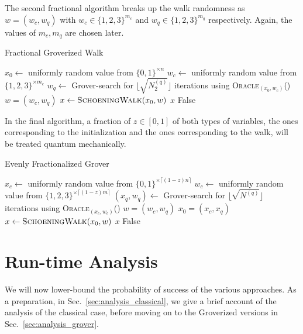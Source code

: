 \documentclass[a4paper,aps,floatfix]{revtex4}
\begin{document}
The second fractional algorithm breaks up the walk randomness as $w=(w_c, w_q)$ with $w_c\in\{1,2,3\}^{m_c}$ and $w_q\in\{1,2,3\}^{m_q}$ respectively.
Again, the values of $m_c, m_q$ are chosen later.

\begin{algorithm}[H]
	\caption{Fractional Groverized Walk}\label{alg:fgw}
	\begin{algorithmic}[1]
				\State $x_0\leftarrow$ uniformly random value from $\{0,1\}^{\times n}$
					\State $w_c\leftarrow$ uniformly random value from $\{1, 2, 3\}^{\times m_c}$
					\State $w_q\leftarrow$ Grover-search for $\Big\lfloor \sqrt{N_2^{(q)}}\Big\rfloor$ iterations using \textsc{Oracle$_{(x_0,w_c)}$}()
					\State $w=(w_c,w_q)$
					\State $x\leftarrow \textsc{SchoeningWalk}(x_0,w)$ 
						\State\Return $x$
					\EndIf
				\EndFor
			\EndFor
			\State \Return False
	\end{algorithmic}
\end{algorithm}

In the final algorithm, a fraction of $z\in[0,1]$ of both types of variables, the ones corresponding to the initialization and the ones corresponding to the walk, will be treated  quantum mechanically.

\begin{algorithm}[H]
	\caption{Evenly Fractionalized Grover}\label{alg:efg}
	\begin{algorithmic}[1]
		\State $x_c\leftarrow$ uniformly random value from $\{0,1\}^{\times \lceil (1-z) n\rceil}$
		\State $w_c\leftarrow$ uniformly random value from $\{1, 2, 3\}^{\times \lceil(1-z)m\rceil}$
			\State $(x_q,w_q)\leftarrow$ Grover-search for $\big\lfloor \sqrt{N^{(q)}}\big\rfloor$ iterations using \textsc{Oracle$_{(x_c,w_c)}$}()
			\State $w=(w_c,w_q)$
			\State $x_0=(x_c,x_q)$
			\State $x\leftarrow \textsc{SchoeningWalk}(x_0,w)$ 
				\State\Return $x$
			\EndIf
		\EndFor
		\State \Return False
	\end{algorithmic}
\end{algorithm}



\section{Run-time Analysis}
\label{sec:runtime}

We will now lower-bound the probability of success of the various approaches.
As a preparation, in Sec.~\ref{sec:analysis_classical}, we give a brief account of the analysis of the classical case, before moving on to the Groverized versions in Sec.~\ref{sec:analysis_grover}.
\end{document}
